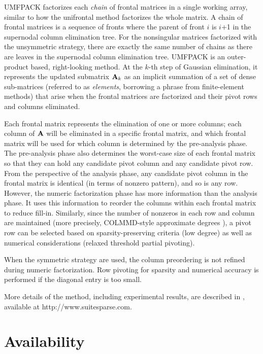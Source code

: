 \documentclass[11pt]{article}
\newcommand{\m}[1]{{\bf{#1}}}       %
\begin{document}
UMFPACK factorizes each {\em chain} of frontal matrices in a single working
array, similar to how the unifrontal method \cite{dusc:96} factorizes the whole
matrix.  A chain of frontal matrices is a sequence of fronts where the parent
of front $i$ is $i$+1 in the supernodal column elimination tree.  For the
nonsingular matrices factorized with the unsymmetric strategy, there are
exactly the same number of chains as there are leaves in the supernodal
column elimination tree.  UMFPACK is an
outer-product based, right-looking method.  At the $k$-th step of Gaussian
elimination, it represents the updated submatrix $\m{A}_k$ as an implicit
summation of a set of dense sub-matrices (referred to as {\em elements},
borrowing a phrase from finite-element methods) that arise when the frontal
matrices are factorized and their pivot rows and columns eliminated.

Each frontal matrix represents the elimination of one or more columns;
each column of $\m{A}$ will be eliminated in a specific frontal matrix,
and which frontal matrix will be used for which column is determined by
the pre-analysis phase.  The pre-analysis phase also determines the worst-case
size of each frontal matrix so that they can hold any candidate pivot column
and any candidate pivot row.  From the perspective of the analysis phase, any
candidate pivot column in the frontal matrix is identical (in terms of nonzero
pattern), and so is any row.  However, the numeric factorization phase has
more information than the analysis phase.  It uses this information to reorder
the columns within each frontal matrix to reduce fill-in.  Similarly, since
the number of nonzeros in each row and column are maintained (more precisely,
COLMMD-style approximate degrees \cite{GilbertMolerSchreiber}), a pivot row can
be selected based on sparsity-preserving criteria (low degree) as well as
numerical considerations (relaxed threshold partial pivoting).

When the symmetric strategy are used,
the column preordering is not refined during numeric factorization.
Row pivoting for sparsity and numerical accuracy is performed if the
diagonal entry is too small.

More details of the method, including experimental results, are
described in \cite{Davis03,Davis03_algo}, available at
http://www.suitesparse.com.

\section{Availability}
\end{document}
